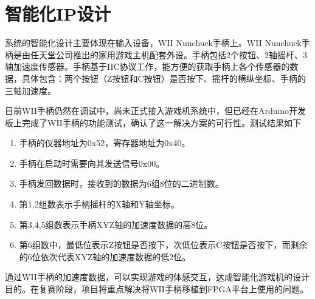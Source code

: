 \section{智能化IP设计}

系统的智能化设计主要体现在输入设备，WII Nunchuck手柄上。WII Nunchuck手柄是由任天堂公司推出的家用游戏主机配套外设。手柄包括2个按钮、2轴摇杆、3轴加速度传感器。手柄基于IIC协议工作，能方便的获取手柄上各个传感器的数据，具体包含：两个按钮（Z按钮和C按钮）是否按下、摇杆的横纵坐标、手柄的三轴加速度。

目前WII手柄仍然在调试中，尚未正式接入游戏机系统中，但已经在Arduino开发板上完成了WII手柄的功能测试，确认了这一解决方案的可行性。测试结果如下
\begin{enumerate}
    \item 手柄的仪器地址为0x52，寄存器地址为0x40。
    \item 手柄在启动时需要向其发送信号0x00。
    \item 手柄发回数据时，接收到的数据为6组8位的二进制数。
    \item 第1,2组数表示手柄摇杆的X轴和Y轴坐标。
    \item 第3,4,5组数表示手柄XYZ轴的加速度数据的高$8$位。
    \item 第6组数中，最低位表示Z按钮是否按下，次低位表示C按钮是否按下，而剩余的$6$位依次代表XYZ轴的加速度数据的低$2$位。
\end{enumerate}

通过WII手柄的加速度数据，可以实现游戏的体感交互，达成智能化游戏机的设计目的。在复赛阶段，项目将重点解决将WII手柄移植到FPGA平台上使用的问题。